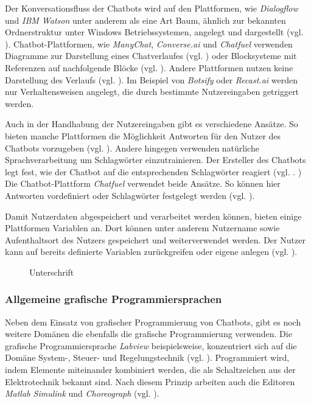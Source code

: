 Der Konversationsfluss der Chatbots wird auf den Plattformen, wie \emph{Dialogflow} und \emph{IBM Watson} unter anderem als eine Art Baum, ähnlich zur bekannten Ordnerstruktur unter Windows Betriebssystemen, angelegt und dargestellt (vgl. \cite{Dialogfl40:online} \cite{KatalogI56:online}). Chatbot-Plattformen, wie \emph{ManyChat}, \emph{Converse.ai} und \emph{Chatfuel} verwenden Diagramme zur Darstellung eines Chatverlaufes (vgl. \cite{Converse15:online} \cite{WelcomeM66:online}) oder Blocksysteme mit Referenzen auf nachfolgende Blöcke (vgl. \cite{Chatfuel3:online}). Andere Plattformen nutzen keine Darstellung des Verlaufs (vgl. \cite{BotsifyC64:online}). Im Beispiel von \emph{Botsify} oder \emph{Recast.ai} werden nur Verhaltensweisen angelegt, die durch bestimmte Nutzereingaben getriggert werden. 

Auch in der Handhabung der Nutzereingaben gibt es verschiedene Ansätze. So bieten manche Plattformen die Möglichkeit Antworten für den Nutzer des Chatbots vorzugeben (vgl. \cite{Chatfuel3:online} \cite{WelcomeM66:online}). Andere hingegen verwenden natürliche Sprachverarbeitung um Schlagwörter einzutrainieren. Der Ersteller des Chatbots legt fest, wie der Chatbot auf die entsprechenden Schlagwörter reagiert (vgl. \cite{BotsifyC64:online}. \cite{Dialogfl40:online} \cite{KatalogI56:online}) Die Chatbot-Plattform \emph{Chatfuel} verwendet beide Ansätze. So können hier Antworten vordefiniert oder Schlagwörter festgelegt werden (vgl. \cite{Chatfuel3:online}). 

Damit Nutzerdaten abgespeichert und verarbeitet werden können, bieten einige Plattformen Variablen an. Dort können unter anderem Nutzername sowie Aufenthaltsort des Nutzers gespeichert und weiterverwendet werden. Der Nutzer kann auf bereits definierte Variablen zurückgreifen oder eigene anlegen (vgl. \cite{Chatfuel3:online} \cite{Converse15:online} \cite{Dialogfl40:online} \cite{KatalogI56:online} \cite{WelcomeM66:online}). 

\begin{figure}[h]
\centering
{}
\caption{Unterschrift}
\label{chatPlat}
\end{figure}

\subsubsection{Allgemeine grafische Programmiersprachen}

Neben dem Einsatz von grafischer Programmierung von Chatbots, gibt es noch weitere Domänen die ebenfalls die grafische Programmierung verwenden. Die grafische Programmiersprache \emph{Labview} beispielsweise, konzentriert sich auf die Domäne System-, Steuer- und Regelungstechnik (vgl. \cite{WasistLa94:online}). Programmiert wird, indem Elemente miteinander kombiniert werden, die als Schaltzeichen aus der Elektrotechnik bekannt sind. Nach diesem Prinzip arbeiten auch die Editoren \emph{Matlab Simulink} und \emph{Choreograph} (vgl. \cite{Choregra47:online} \cite{Simulink28:online}).


